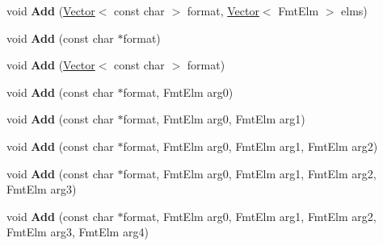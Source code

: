 \begin{DoxyCompactItemize}
\item 
\hypertarget{classv8_1_1internal_1_1_v8___f_i_n_a_l_abf58480b19981aa38b698c678d0aebee}{}void {\bfseries Add} (\hyperlink{classv8_1_1internal_1_1_vector}{Vector}$<$ const char $>$ format, \hyperlink{classv8_1_1internal_1_1_vector}{Vector}$<$ Fmt\+Elm $>$ elms)\label{classv8_1_1internal_1_1_v8___f_i_n_a_l_abf58480b19981aa38b698c678d0aebee}

\item 
\hypertarget{classv8_1_1internal_1_1_v8___f_i_n_a_l_afe5ca602ad199c3f21571898dfab38d8}{}void {\bfseries Add} (const char $\ast$format)\label{classv8_1_1internal_1_1_v8___f_i_n_a_l_afe5ca602ad199c3f21571898dfab38d8}

\item 
\hypertarget{classv8_1_1internal_1_1_v8___f_i_n_a_l_a50fb4976eace81abdc3666f9978412b0}{}void {\bfseries Add} (\hyperlink{classv8_1_1internal_1_1_vector}{Vector}$<$ const char $>$ format)\label{classv8_1_1internal_1_1_v8___f_i_n_a_l_a50fb4976eace81abdc3666f9978412b0}

\item 
\hypertarget{classv8_1_1internal_1_1_v8___f_i_n_a_l_ab221b0b892c6b3c8ce8174caa975c9b3}{}void {\bfseries Add} (const char $\ast$format, Fmt\+Elm arg0)\label{classv8_1_1internal_1_1_v8___f_i_n_a_l_ab221b0b892c6b3c8ce8174caa975c9b3}

\item 
\hypertarget{classv8_1_1internal_1_1_v8___f_i_n_a_l_a9c9fcfb5b90e3c8582147db19ec4ecb9}{}void {\bfseries Add} (const char $\ast$format, Fmt\+Elm arg0, Fmt\+Elm arg1)\label{classv8_1_1internal_1_1_v8___f_i_n_a_l_a9c9fcfb5b90e3c8582147db19ec4ecb9}

\item 
\hypertarget{classv8_1_1internal_1_1_v8___f_i_n_a_l_a99380d717f02de47450e4b57c83ef8c2}{}void {\bfseries Add} (const char $\ast$format, Fmt\+Elm arg0, Fmt\+Elm arg1, Fmt\+Elm arg2)\label{classv8_1_1internal_1_1_v8___f_i_n_a_l_a99380d717f02de47450e4b57c83ef8c2}

\item 
\hypertarget{classv8_1_1internal_1_1_v8___f_i_n_a_l_a5656857426eb4ec6d73a40b90eea8470}{}void {\bfseries Add} (const char $\ast$format, Fmt\+Elm arg0, Fmt\+Elm arg1, Fmt\+Elm arg2, Fmt\+Elm arg3)\label{classv8_1_1internal_1_1_v8___f_i_n_a_l_a5656857426eb4ec6d73a40b90eea8470}

\item 
\hypertarget{classv8_1_1internal_1_1_v8___f_i_n_a_l_ac10feb66313effa6d59e320314d2fabf}{}void {\bfseries Add} (const char $\ast$format, Fmt\+Elm arg0, Fmt\+Elm arg1, Fmt\+Elm arg2, Fmt\+Elm arg3, Fmt\+Elm arg4)\label{classv8_1_1internal_1_1_v8___f_i_n_a_l_ac10feb66313effa6d59e320314d2fabf}


\end{DoxyCompactItemize}
